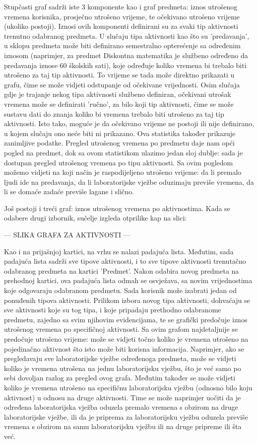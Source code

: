 \documentclass[times, utf8, zavrsni]{fer}
\begin{document}
Stupčasti graf sadrži iste 3 komponente kao i graf predmeta: iznos utrošenog vremena korisnika, prosječno utrošeno vrijeme, te očekivano utrošeno vrijeme (ukoliko postoji). Iznosi ovih komponenti definirani su za svaki tip aktivnosti trenutno odabranog predmeta. U slučaju tipa aktivnosti kao što su 'predavanja', u sklopu predmeta može biti definirano semestralno opterećenje sa određenim iznosom (naprimjer, za predmet Diskontna matematika je službeno određeno da predavanja iznose 60 školskih sati), koje određuje koliko vremena bi trebalo biti utrošeno za taj tip aktivnosti. To vrijeme se tada može direktno prikazati u grafu, čime se može vidjeti odstupanje od očekivane vrijednosti. Osim slučaja gdje je trajanje nekog tipa aktivnosti službeno definiran, očekivani utrošak vremena može se definirati 'ručno', za bilo koji tip aktivnosti, čime se može sustavu dati do znanja koliko bi vremena trebalo biti utrošeno za taj tip aktivnosti. Isto tako, moguće je da očekivano vrijeme ne postoji ili nije definirano, u kojem slučaju ono neće biti ni prikazano.
Ova statistika također prikazuje zanimljive podatke. Pregled utrošenog vremena po predmetu daje nam opći pogled na predmet, dok sa ovom statistikom ulazimo jedan sloj dublje: sada je dostupan pregled utrošenog vremena po tipu aktivnosti. Sa ovim pogledom možemo vidjeti na koji način je raspodijeljeno utrošeno vrijeme: da li premalo ljudi ide na predavanja, da li laboratorijske vježbe oduzimaju previše vremena, da li se domaće zadaće previše lagane i slično.

Još postoji i treći graf: iznos utrošenog vremena po aktivnostima. Kada se odabere drugi izbornik, sučelje izgleda otprilike kap na slici:

--- SLIKA GRAFA ZA AKTIVNOSTI ---

Kao i na prijašnjoj kartici, na vrhu se nalazi padajuća lista. Međutim, sada padajuća lista sadrži sve tipove aktivnosti, i to sve tipove aktivnosti trenutačno odabranog predmeta na kartici 'Predmet'. Nakon odabira novog predmeta na prehodnoj kartici, ova padajuća lista odmah se osvježava, sa novim vrijednostima koje odgovaraju odabranom predmetu. Sada korisnik može izabrati jedan od ponuđenih tipova aktivnosti. Prilikom izbora novog tipa aktivnosti, dohvaćaju se sve aktivnosti koje su tog tipa, i koje pripadaju prethodno odabranome predmetu, zajedno sa svim njihovim evidencijama, te se grafički predočuje iznos utrošenog vremena po specifičnoj aktivnosti. Sa ovim grafom najdetaljnije se predočuje utrošeno vrijeme: može se vidjeti točno koliko je vremena utrošeno na pojedinačno aktivnost što isto može biti korisna informacija. Naprimjer, ako se pregledavaju sve laboratorijske vježbe određenoga predmeta, može se vidjeti koliko je vremena utrošena na jednu laboratorijsku vježbu, što je već samo po sebi dovoljan razlog za pregled ovog grafa. Međutim također se može vidjeti koliko je vremena utrošeno na specifičnu laboratorijsku vježbu (odnosno bilo koju aktivnost) u odnosu na druge aktivnosti. Time se može naprimjer uočiti da je određena laboratorijska vježba oduzela premalo vremena s obzirom na druge laboratorijske vježbe, ili da je priprema za laboratorijsku vježbu oduzela previše vremena s obzirom na samu laboratorijsku vježbu ili na druge pripreme ili šta već.
\end{document}
